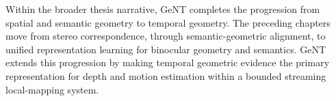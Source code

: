
Within the broader thesis narrative, GeNT completes the progression from spatial and semantic geometry to temporal geometry.
The preceding chapters move from stereo correspondence, through semantic-geometric alignment, to unified representation learning for binocular geometry and semantics.
GeNT extends this progression by making temporal geometric evidence the primary representation for depth and motion estimation within a bounded streaming local-mapping system.

